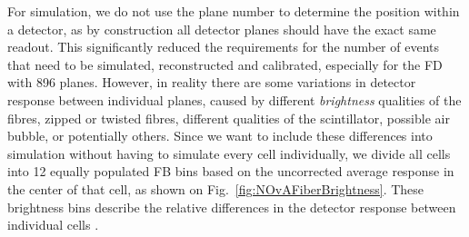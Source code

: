 

For simulation, we do not use the plane number to determine the position within a detector, as by construction all detector planes should have the exact same readout. This significantly reduced the requirements for the number of events that need to be simulated, reconstructed and calibrated, especially for the \gls{FD} with 896 planes. However, in reality there are some variations in detector response between individual planes, caused by different \textit{brightness} qualities of the fibres, zipped or twisted fibres, different qualities of the scintillator, possible air bubble, or potentially others. Since we want to include these differences into simulation without having to simulate every cell individually, we divide all cells into 12 equally populated \gls{FB} bins based on
the uncorrected average response in the center of that cell, as shown on Fig.~\ref{fig:NOvAFiberBrightness}. These brightness bins describe the relative differences in the detector response between individual cells \cite{NOvA-doc-34909}.


